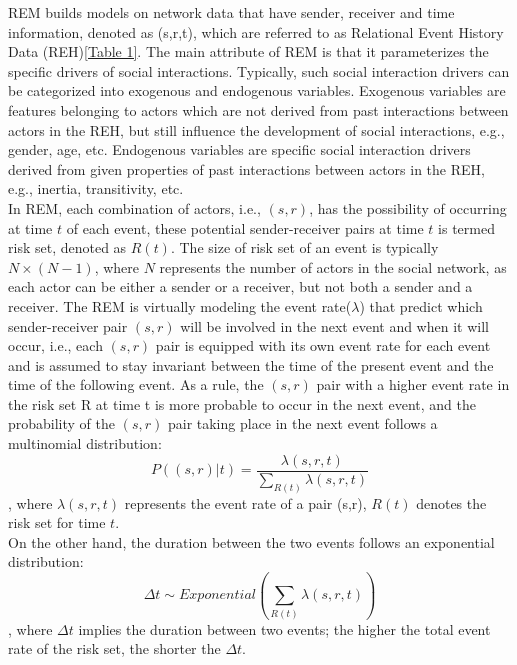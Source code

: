 \documentclass[]{interact}
\theoremstyle{plain}%
\theoremstyle{definition}
\theoremstyle{remark}
\begin{document}
REM builds models on network data that have sender, receiver and time information, denoted as (s,r,t), which are referred to as Relational Event History Data (REH)\ref{Table 1}. The main attribute of REM is that it parameterizes the specific drivers of social interactions. Typically, such social interaction drivers can be categorized into exogenous and endogenous variables. Exogenous variables are features belonging to actors which are not derived from past interactions between actors in the REH, but still influence the development of social interactions, e.g., gender, age, etc. Endogenous variables are specific social interaction drivers derived from given properties of past interactions between actors in the REH, e.g., inertia, transitivity, etc.\\

In REM, each combination of actors, i.e., $(s,r)$, has the possibility of occurring at time $t$ of each event, these potential sender-receiver pairs at time $t$ is termed risk set, denoted as $R(t)$. The size of risk set of an event is typically $N \times (N-1)$, where $N$ represents the number of actors in the social network, as each actor can be either a sender or a receiver, but not both a sender and a receiver. The REM is virtually modeling the event rate($\lambda$) that predict which sender-receiver pair $(s,r)$ will be involved in the next event and when it will occur, i.e., each $(s,r)$ pair is equipped with its own event rate for each event and is assumed to stay invariant between the time of the present event and the time of the following event. As a rule, the $(s,r)$ pair with a higher event rate in the risk set R at time t is more probable to occur in the next event, and the probability of the $(s,r)$ pair taking place in the next event follows a multinomial distribution:
\begin{equation} \label{1}
	P \left((s,r) | t \right) = \dfrac{\lambda(s,r,t)} {\sum_{R(t)} \lambda(s,r,t)}
\end{equation}
, where $\lambda(s,r,t)$ represents the event rate of a pair (s,r), $R(t)$ denotes the risk set for time $t$. \\

On the other hand, the duration between the two events follows an exponential distribution: 
\begin{equation} \label{2}
	\Delta t \sim Exponential \left(\sum_{R(t)} \lambda(s,r,t) \right)
\end{equation}
, where $\Delta t$ implies the duration between two events; the higher the total event rate of the risk set, the shorter the $\Delta t$. \\
\end{document}
